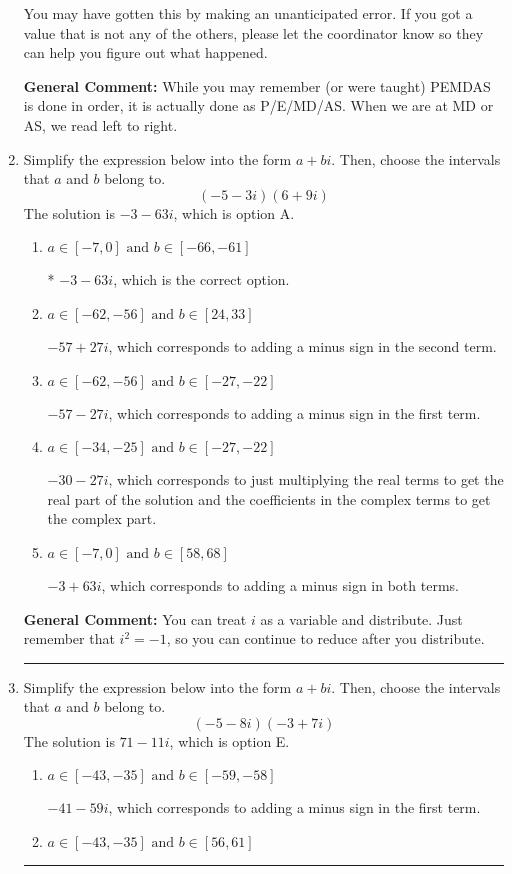 \documentclass{extbook}[14pt]
\newcommand{\litem}[1]{\item #1

\rule{\textwidth}{0.4pt}}
\begin{document}
\begin{enumerate}
{\begin{enumerate}[label=\Alph*.]
 You may have gotten this by making an unanticipated error. If you got a value that is not any of the others, please let the coordinator know so they can help you figure out what happened.
\end{enumerate}

\textbf{General Comment:} While you may remember (or were taught) PEMDAS is done in order, it is actually done as P/E/MD/AS. When we are at MD or AS, we read left to right.
}
\litem{
Simplify the expression below into the form $a+bi$. Then, choose the intervals that $a$ and $b$ belong to.
\[ (-5 - 3 i)(6 + 9 i) \]The solution is \( -3 - 63 i \), which is option A.\begin{enumerate}[label=\Alph*.]
\item \( a \in [-7, 0] \text{ and } b \in [-66, -61] \)

* $-3 - 63 i$, which is the correct option.
\item \( a \in [-62, -56] \text{ and } b \in [24, 33] \)

 $-57 + 27 i$, which corresponds to adding a minus sign in the second term.
\item \( a \in [-62, -56] \text{ and } b \in [-27, -22] \)

 $-57 - 27 i$, which corresponds to adding a minus sign in the first term.
\item \( a \in [-34, -25] \text{ and } b \in [-27, -22] \)

 $-30 - 27 i$, which corresponds to just multiplying the real terms to get the real part of the solution and the coefficients in the complex terms to get the complex part.
\item \( a \in [-7, 0] \text{ and } b \in [58, 68] \)

 $-3 + 63 i$, which corresponds to adding a minus sign in both terms.
\end{enumerate}

\textbf{General Comment:} You can treat $i$ as a variable and distribute. Just remember that $i^2=-1$, so you can continue to reduce after you distribute.
}
\litem{
Simplify the expression below into the form $a+bi$. Then, choose the intervals that $a$ and $b$ belong to.
\[ (-5 - 8 i)(-3 + 7 i) \]The solution is \( 71 - 11 i \), which is option E.\begin{enumerate}[label=\Alph*.]
\item \( a \in [-43, -35] \text{ and } b \in [-59, -58] \)

 $-41 - 59 i$, which corresponds to adding a minus sign in the first term.
\item \( a \in [-43, -35] \text{ and } b \in [56, 61] \)


\end{enumerate}}
\end{enumerate}
\end{document}
